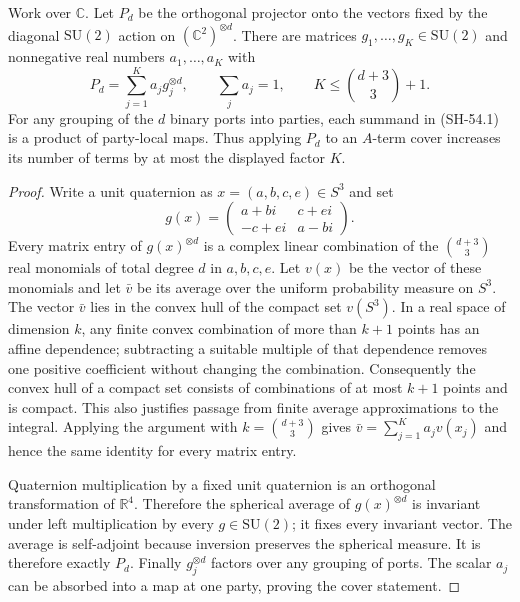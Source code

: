\begin{lemma}
\label{lem:polynomial-spin-zero-projection}
Work over $\mathbb C$.  Let $P_d$ be the orthogonal
projector onto the vectors fixed by the diagonal
$\mathrm{SU}(2)$ action on $(\mathbb C^2)^{\otimes d}$.
There are matrices $g_1,\ldots,g_K\in\mathrm{SU}(2)$ and
nonnegative real numbers $a_1,\ldots,a_K$ with
\[
 P_d=\sum_{j=1}^K a_j g_j^{\otimes d},\qquad
 \sum_j a_j=1,\qquad
 K\leq {d+3\choose3}+1.
 \tag{SH-54.1}
\]
For any grouping of the $d$ binary ports into parties,
each summand in (SH-54.1) is a product of party-local
maps.  Thus applying $P_d$ to an $A$-term cover increases
its number of terms by at most the displayed factor $K$.
\end{lemma}
\begin{proof}
Write a unit quaternion as $x=(a,b,c,e)\in S^3$ and set
\[
 g(x)=
 \begin{pmatrix}a+bi&c+ei\\-c+ei&a-bi\end{pmatrix}.
\]
Every matrix entry of $g(x)^{\otimes d}$ is a complex
linear combination of the ${d+3\choose3}$ real monomials
of total degree $d$ in $a,b,c,e$.  Let $v(x)$ be the
vector of these monomials and let $\bar v$ be its
average over the uniform probability measure on $S^3$.
The vector $\bar v$ lies in the convex hull of the
compact set $v(S^3)$.  In a real space of dimension $k$,
any finite convex combination of more than $k+1$ points
has an affine dependence; subtracting a suitable multiple
of that dependence removes one positive coefficient
without changing the combination.  Consequently the
convex hull of a compact set consists of combinations
of at most $k+1$ points and is compact.  This also
justifies passage from finite average approximations
to the integral.  Applying the argument with
$k={d+3\choose3}$ gives
$\bar v=\sum_{j=1}^K a_jv(x_j)$ and hence the same
identity for every matrix entry.

Quaternion multiplication by a fixed unit quaternion
is an orthogonal transformation of $\mathbb R^4$.
Therefore the spherical average of $g(x)^{\otimes d}$
is invariant under left multiplication by every
$g\in\mathrm{SU}(2)$; it fixes every invariant vector.
The average is self-adjoint because inversion preserves
the spherical measure.  It is therefore exactly $P_d$.
Finally $g_j^{\otimes d}$ factors over any grouping of
ports.  The scalar $a_j$ can be absorbed into a map at
one party, proving the cover statement.
\end{proof}

